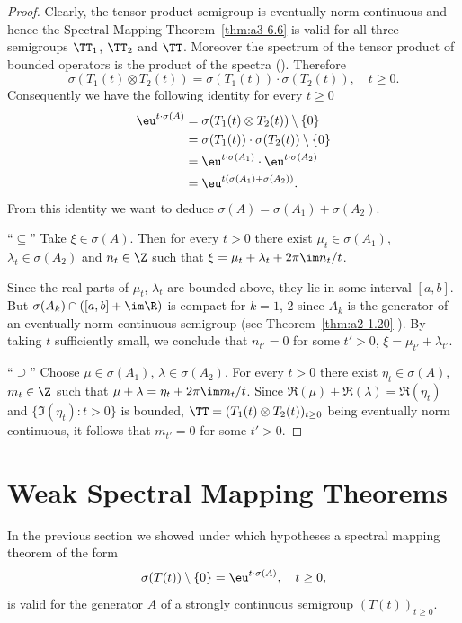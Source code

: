 \begin{proof}
Clearly, the tensor product semigroup is eventually norm continuous and hence the Spectral Mapping Theorem~\ref{thm:a3-6.6} is valid for all three semigroups $\TT_{1}$, $\TT_{2}$ and $\TT$.
Moreover the spectrum of the tensor product of bounded operators is the product of the spectra 
(\textcite[XIII.9]{reedsimon:1978}).
Therefore
\[
	\sigma(T_{1}(t)\otimes T_{2}(t)) = \sigma(T_{1}(t))\cdot\sigma(T_{2}(t)), \quad t \geq 0 .
\]
Consequently we have the following identity for every $t \geq 0$ 
\begin{align*}
\eu^{t\cdot\sigma(A)} &= \sigma(T_{1}(t)\otimes T_{2}(t)) \setminus \{0\} \\
&= \sigma(T_{1}(t))\cdot\sigma(T_{2}(t)) \setminus \{0\} \\
&= \eu^{t\cdot\sigma(A_{1})}\cdot \eu^{t\cdot\sigma(A_{2})} \\
&= \eu^{t(\sigma(A_{1})+\sigma(A_{2}))} .
\end{align*}
From this identity we want to deduce $\sigma(A) = \sigma(A_{1}) + \sigma(A_{2})$.

\enquote{$\subseteq$}\quad 
Take $\xi \in \sigma(A)$.
Then for every $t > 0$ there exist $\mu_{t} \in \sigma(A_{1})$, $\lambda_{t} \in \sigma(A_{2})$ and $n_{t} \in \Z$ such that $\xi = \mu_{t} + \lambda_{t} + 2\pi\im  n_{t}/t$.

Since the real parts of\/ $\mu_{t}$, $\lambda_{t}$ are bounded above, they lie in some interval $[a,b]$.
But $\sigma(A_{k}) \cap ( [a,b] + \im \R )$ is compact for $k = 1$, $2$  since $A_{k}$ is the generator of an eventually norm continuous semigroup (see Theorem~\ref{thm:a2-1.20} ).
By taking $t$ sufficiently small, we conclude that $n_{t'} = 0$ for some $t' > 0$, \ie $\xi = \mu_{t'} + \lambda_{t'}$.

\enquote{$\supseteq$}\quad 
Choose $\mu \in \sigma(A_{1})$, $\lambda \in \sigma(A_{2})$.
For every $t > 0$ there exist $\eta_{t} \in \sigma(A)$, $m_{t} \in \Z$ such that $\mu + \lambda = \eta_{t} + 2\pi \im m_{t}/t$.
Since $\Re(\mu) + \Re(\lambda) = \Re(\eta_{t})$ and $\{\Im(\eta_{t}) \colon t > 0\}$ is bounded, 
$\TT = (T_{1}(t) \otimes T_{2}(t))_{t\geq 0}$ being eventually norm continuous, it follows that $m_{t'} = 0$ for some $t' > 0$.
\end{proof}
\section{Weak Spectral Mapping Theorems}\label{sec:a3-7}%
In the previous section we showed under which hypotheses a spectral mapping theorem of the form
\begin{equation}\label{eq:a3-7.1}
	\sigma(T(t)) \setminus \{0\} = \eu^{t \cdot \sigma(A)}, \quad t \geq 0 ,
\end{equation}
is valid for the generator $A$ of a strongly continuous semigroup $(T(t))_{t\geq 0}$.

